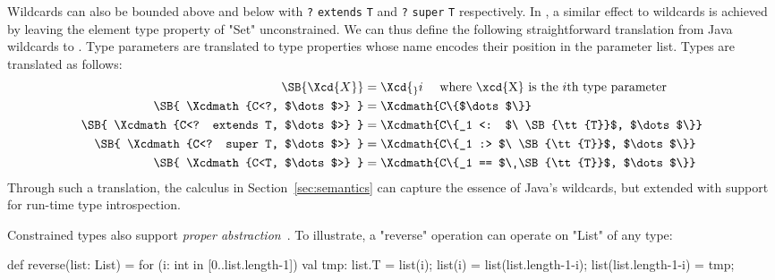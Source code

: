 Wildcards can
also be bounded above and below with
{\tt ?} {\tt extends} {\tt T} and {\tt ?} {\tt super} {\tt T} respectively.
%
In \Xten{}, a similar effect to wildcards is achieved by leaving the
element type property of \xcd"Set" unconstrained.
%
We can thus define the following straightforward translation
from Java wildcards to \Xten{}.
Type parameters are translated to type properties whose name
encodes their position in the parameter list.
Types are translated as follows:
{\footnotesize
\begin{align*}
\SB{ \Xcd{X} } &= \Xcd{_}i ~~~~\mbox{where \xcd{X} is the $i$th type parameter} \\
\SB{ \Xcdmath{C<?, $\dots$>} } &= \Xcdmath{C\{$\dots$\}} \\
\SB{ \Xcdmath{C<? extends T, $\dots$>} } &= \Xcdmath{C\{_1 <: $\ \SB{\tt{T}}$, $\dots$\}} \\
\SB{ \Xcdmath{C<? super T, $\dots$>} } &= \Xcdmath{C\{_1 :> $\ \SB{\tt{T}}$, $\dots$\}} \\
\SB{ \Xcdmath{C<T, $\dots$>} } &= \Xcdmath{C\{_1 == $\ \SB{\tt{T}}$, $\dots$\}}
\end{align*}}
Through such a translation, the \FXG calculus in
Section~\ref{sec:semantics} can capture the essence of Java's
wildcards, but extended with support for run-time type
introspection.


Constrained types also support
\emph{proper abstraction}~\cite{adding-wildcards}.  To illustrate, a
\xcd"reverse"
operation can operate on \xcd"List" of any type:
{\footnotesize
\begin{xten}
def reverse(list: List) = {
  for (i: int in [0..list.length-1]) {
    val tmp: list.T = list(i);
    list(i) = list(list.length-1-i);
    list(list.length-1-i) = tmp;
  }
}
\end{xten}}

